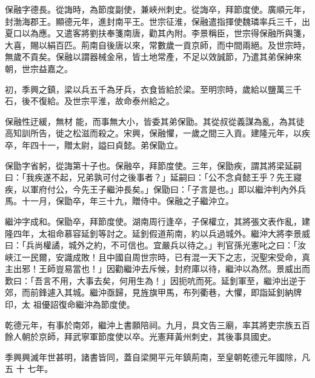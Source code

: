 \begin{pinyinscope}
 保融字德長。從誨時，為節度副使，兼峽州刺史。從誨卒，拜節度使。廣順元年，封渤海郡王。顯德元年，進封南平王。世宗征淮，保融遣指揮使魏璘率兵三千，出夏口以為應。又遣客將劉扶奉箋南唐，勸其內附。李景稱臣，世宗得保融所與箋，大喜，賜以絹百匹。荊南自後唐以來，常數歲一貢京師，而中間兩絕。及世宗時，無歲不貢矣。保融以謂器械金帛，皆土地常產，不足以效誠節，乃遣其弟保紳來朝，世宗益嘉之。



 初，季興之鎮，梁以兵五千為牙兵，衣食皆給於梁。至明宗時，歲給以鹽萬三千石，後不復給。及世宗平淮，故命泰州給之。



 保融性迂緩，無材
 能，而事無大小，皆委其弟保勖。其從叔從義謀為亂，為其徒高知訓所告，徙之松滋而殺之。宋興，保融懼，一歲之間三入貢。建隆元年，以疾卒，年四十一，贈太尉，謚曰貞懿。弟保勖立。



 保勖字省躬，從誨第十子也。保融卒，拜節度使。三年，保勖疾，謂其將梁延嗣曰：「我疾遂不起，兄弟孰可付之後事者？」延嗣曰：「公不念貞懿王乎？先王寢疾，以軍府付公，今先王子繼沖長矣。」保勖曰：「子言是也。」即以繼沖判內外兵馬。十一月，保勖卒，年三十九，贈侍中。保融之子繼沖立。



 繼沖字成和。保勖卒，拜節度使。湖南周行逢卒，子保權立，其將張文表作亂，建隆四年，太祖命慕容延釗等討之。延釗假道荊南，約以兵過城外。繼沖大將李景威曰：「兵尚權譎，城外之約，不可信也。宜嚴兵以待之。」判官孫光憲叱之曰：「汝峽江一民爾，安識成敗！且中國自周世宗時，已有混一天下之志，況聖宋受命，真主出邪！王師豈易當也！」因勸繼沖去斥候，封府庫以待，繼沖以為然。景威出而歎曰：「吾言不用，大事去矣，何用生為！」因扼吭而死。延釗軍至，繼沖出逆于郊，而前鋒遽入其城。繼沖亟歸，見旌旗甲馬，布列衢巷，大懼，即詣延釗納牌印，太
 祖優詔復命繼沖為節度使。



 乾德元年，有事於南郊，繼沖上書願陪祠。九月，具文告三廟，率其將吏宗族五百餘人朝於京師，拜武寧軍節度使以卒。光憲拜黃州刺史，其後事具國史。



 季興興滅年世甚明，諸書皆同，蓋自梁開平元年鎮荊南，至皇朝乾德元年國除，凡五
 十
 七年。



\end{pinyinscope}